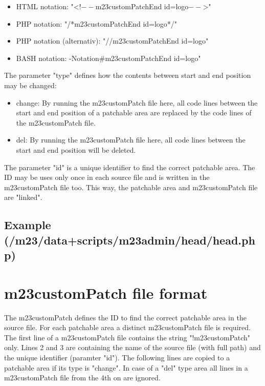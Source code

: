 \begin{itemize}
	\item HTML notation: "<!$--$m23customPatchEnd id=logo$--$>"
	\item PHP notation: "/*m23customPatchEnd id=logo*/"
	\item PHP notation (alternativ): "//m23customPatchEnd id=logo"
	\item BASH notation: -Notation#m23customPatchEnd id=logo"
\end{itemize}

The parameter "type" defines how the contents between start and end position may be changed:

\begin{itemize}
	\item change: By running the m23customPatch file here, all code lines between the start and end position of a patchable area are replaced by the code lines of the m23customPatch file.
	\item del: By running the m23customPatch file here, all code lines between the start and end position will be deleted.
\end{itemize}

The parameter "id" is a unique identifier to find the correct patchable area. The ID may be uses only once in each source file and is written in the m23customPatch file too. This way, the patchable area and m23customPatch file are "linked".

\subsection{Example (/m23/data+scripts/m23admin/head/head.php)}






\section{m23customPatch file format}
The m23customPatch defines the ID to find the correct patchable area in the source file. For each patchable area a distinct m23customPatch file is required. The first line of a m23customPatch file contains the string "!m23customPatch" only. Lines 2 and 3 are containing the name of the source file (with full path) and the unique identifier (paramter "id"). The following lines are copied to a patchable area if its type is "change". In case of a "del" type area all lines in a m23customPatch file from the 4th on are ignored.


